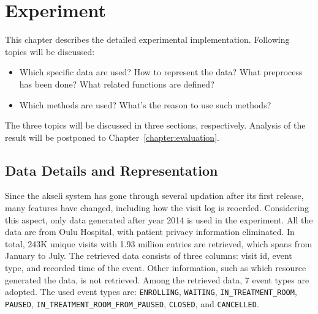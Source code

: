 \chapter{Experiment}
\label{chapter:Experiment}


	
This chapter describes the detailed experimental implementation. Following topics will be discussed:
\begin{itemize}
	\item	Which specific data are used? How to represent the data? What preprocess has been done? What related functions are defined?
	\item	Which methods are used? What's the reason to use such methods? 
\end{itemize}
The three topics will be discussed in three sections, respectively. Analysis of the result will be postponed to Chapter~\ref{chapter:evaluation}.

\section{Data Details and Representation}
Since the akseli system has gone through several updation after its first release, many features have changed, including how the visit log is reocrded. Considering this aspect, only data generated after year 2014 is used in the experiment. All the data are from Oulu Hospital, with patient privacy information eliminated. In total, 243K unique visits with 1.93 million entries are retrieved, which spans from January to July. The retrieved data consists of three columns: visit id, event type, and recorded time of the event. Other information, such as which resource generated the data, is not retrieved. Among the retrieved data, 7 event types are adopted. The used event types are: \texttt{ENROLLING}, \texttt{WAITING}, \texttt{IN\_TREATMENT\_ROOM}, \texttt{PAUSED}, \texttt{IN\_TREATMENT\_ROOM\_FROM\_PAUSED}, \texttt{CLOSED}, and \texttt{CANCELLED}.

